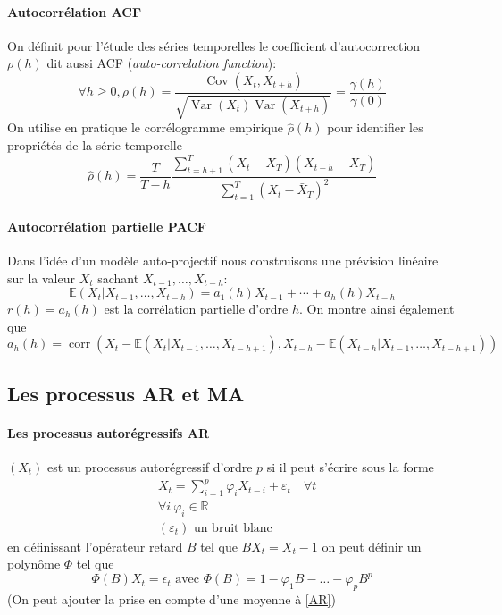 \documentclass{article}
\theoremstyle{definition}
\theoremstyle{remark}
\begin{document}
\paragraph{Autocorrélation ACF\\}
On définit pour l'étude des séries temporelles le coefficient d'autocorrection $\rho(h)$ dit aussi ACF (\textit{auto-correlation function}):
\[
\forall h \geqslant 0, \rho(h)=\frac{\operatorname{Cov}\left(X_{t}, X_{t+h}\right)}{\sqrt{\operatorname{Var}\left(X_{t}\right) \operatorname{Var}\left(X_{t+h}\right)}}=\frac{\gamma(h)}{\gamma(0)}
\]
On utilise en pratique le corrélogramme empirique $\widehat{\rho}(h)$ pour identifier les propriétés de la série temporelle
\begin{equation}
	\widehat{\rho}(h)=\frac{T}{T-h} \frac{\sum_{t=h+1}^{T}\left(X_{t}-\bar{X}_{T}\right)\left(X_{t-h}-\bar{X}_{T}\right)}{\sum_{t=1}^{T}\left(X_{t}-\bar{X}_{T}\right)^{2}}
\end{equation}
\paragraph{Autocorrélation partielle PACF\\}
Dans l'idée d'un modèle auto-projectif nous construisons une prévision linéaire sur la valeur $X_t$ sachant $X_{t-1}, \ldots, X_{t-h}$:
\[
	\mathbb{E}\left(X_{t} | X_{t-1}, \ldots, X_{t-h}\right)=a_{1}(h) X_{t-1}+\cdots+a_{h}(h) X_{t-h}
\]
$r(h) = a_h(h)$ est la corrélation partielle d'ordre $h$. On montre ainsi également que 
\[
	a_{h}(h)=\operatorname{corr}\left(X_{t}-\mathbb{E}\left(X_{t} | X_{t-1}, \dots, X_{t-h+1}\right), 
	X_{t-h}-\mathbb{E}\left(X_{t-h} | X_{t-1}, \ldots, X_{t-h+1}\right)\right)
\]

\subsection{Les processus AR et MA}

\paragraph{Les processus autorégressifs AR \\}
$(X_t)$ est un processus autorégressif d'ordre $p$ si il peut s'écrire sous la forme
\begin{equation}
	\label{AR}
	\begin{aligned}
		&X_{t}=\sum_{i=1}^{p} \varphi_{i} X_{t-i}+\varepsilon_{t} \quad 	\forall t\\
		&\forall i \ \varphi_{i} \in \mathbb{R} \\ 
		&\left(\varepsilon_{t}\right) \text { un bruit blanc }
	\end{aligned}
\end{equation}
en définissant l'opérateur retard $B$ tel que $B X_t=X_t-1$ on peut définir un polynôme $\Phi$
tel que 
\[
\Phi(B) X_t = \epsilon_t \text{ avec } \Phi(B) = 1 - \varphi_1 B - \ldots - \varphi_p B^p	
\]
(On peut ajouter la prise en compte d'une moyenne à \ref{AR})
\end{document}
